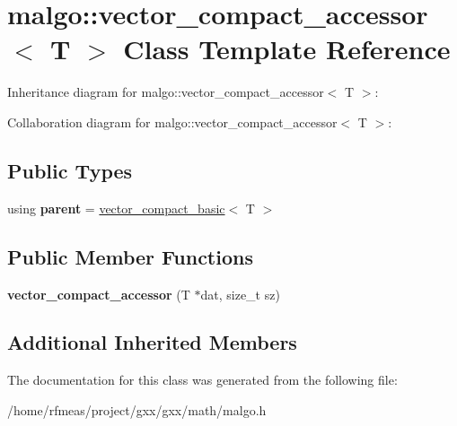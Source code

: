 \hypertarget{classmalgo_1_1vector__compact__accessor}{}\section{malgo\+:\+:vector\+\_\+compact\+\_\+accessor$<$ T $>$ Class Template Reference}
\label{classmalgo_1_1vector__compact__accessor}


Inheritance diagram for malgo\+:\+:vector\+\_\+compact\+\_\+accessor$<$ T $>$\+:


Collaboration diagram for malgo\+:\+:vector\+\_\+compact\+\_\+accessor$<$ T $>$\+:
\subsection*{Public Types}
\begin{DoxyCompactItemize}
\item 
using {\bfseries parent} = \hyperlink{classmalgo_1_1vector__compact__basic}{vector\+\_\+compact\+\_\+basic}$<$ T $>$\hypertarget{classmalgo_1_1vector__compact__accessor_a77c573ace9eb4010612efebfd6b2bbdb}{}\label{classmalgo_1_1vector__compact__accessor_a77c573ace9eb4010612efebfd6b2bbdb}

\end{DoxyCompactItemize}
\subsection*{Public Member Functions}
\begin{DoxyCompactItemize}
\item 
{\bfseries vector\+\_\+compact\+\_\+accessor} (T $\ast$dat, size\+\_\+t sz)\hypertarget{classmalgo_1_1vector__compact__accessor_ab4bcc705ec4db7d07f2cd566a75b0daa}{}\label{classmalgo_1_1vector__compact__accessor_ab4bcc705ec4db7d07f2cd566a75b0daa}

\end{DoxyCompactItemize}
\subsection*{Additional Inherited Members}


The documentation for this class was generated from the following file\+:\begin{DoxyCompactItemize}
\item 
/home/rfmeas/project/gxx/gxx/math/malgo.\+h\end{DoxyCompactItemize}
